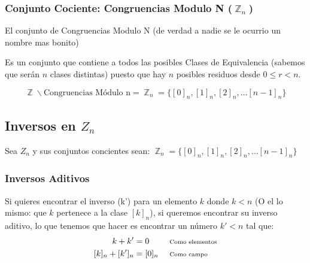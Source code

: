 \documentclass[12pt, fleqn]{report}                             %
\DeclareMathOperator \Space {\quad}                             %
\newcommand \Remember[1]{\Space\text{\scriptsize{#1}}}          %
\newenvironment{MultiLineEquation}[1]                           %
        {\begin{equation}\begin{alignedat}{#1}}                     %
        {\end{alignedat}\end{equation}}                             %
\DeclareMathOperator \Integers  {\mathbb{Z}}                     %
\begin{document}
            \subsubsection*{Conjunto Cociente: Congruencias Modulo N ($\Integers_n$)}

                El conjunto de Congruencias Modulo N (de verdad a nadie se le ocurrio 
                un nombre mas bonito)  

                Es  un conjunto que contiene a todos las posibles Clases de Equivalencia
                (sabemos que serán $n$ clases distintas) puesto que hay $n$ posibles residuos
                desde $0 \leq r < n$.

                \begin{equation}
                    \Integers \backslash \text{Congruencias Módulo n} = 
                        \Integers_n = \{ [0]_n , [1]_n, [2]_n, \dots  [n-1]_n\}
                \end{equation}



        \clearpage
        \subsection{Inversos en $Z_n$}

            Sea $Z_n$ y sus conjuntos concientes sean:
            $\Integers_n = \{ [0]_n , [1]_n, [2]_n, \dots  [n-1]_n\}$


            \subsubsection{Inversos Aditivos}

                Si quieres encontrar el inverso (k') para un elemento $k$ donde $k < n$
                (O el lo mismo: que $k$ pertenece a la clase $[k]_n$), si queremos encontrar
                su inverso aditivo, lo que tenemos que hacer es encontrar un número $k' < n$ tal que:
                \begin{MultiLineEquation}{3}
                    k + k'         &= 0         &&\Remember{Como elementos}    \\
                    [k]_n + [k']_n &= [0]_n     &&\Remember{Como campo}
                \end{MultiLineEquation}
\end{document}
